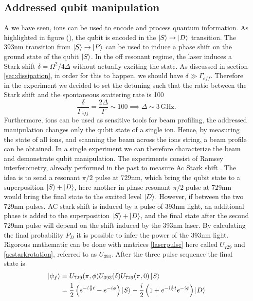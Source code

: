 \subsection{Addressed qubit manipulation}
A we have seen, ions can be used to encode and process quantum information. As highlighted in figure (), the qubit is encoded in the $\ket{S} \to \ket{D}$ transition. The 393nm transition from $\ket{S}\to \ket{P}$ can be used to induce a phase shift on the ground state of the qubit $\ket{S}$. In the off resonant regime, the laser induces a Stark shift $\delta = \Omega^2/4\Delta$ without actually exciting the state. As discussed in section \ref{sec:dissipation}, in order for this to happen, we should have $\delta \gg \Gamma_{eff}$. Therefore in the experiment we decided to set the detuning such that the ratio between the Stark shift and the spontaneous scattering rate is 100
\begin{equation}
\frac{\delta}{\Gamma_{eff}} = \frac{2\Delta}{\Gamma} \sim 100 \implies \Delta \sim 3\,\text{GHz}.
\end{equation}
Furthermore, ions can be used as sensitive tools for beam profiling, the addressed manipulation changes only the qubit state of a single ion. Hence, by measuring the state of all ions, and scanning the beam across the ions string, a beam profile can be obtained. In a single experiment we can therefore characterize the beam and demonstrate qubit manipulation.
The experiments consist of Ramsey interferometry, already performed in the past to measure Ac Stark shift \cite{starkshift}.
The idea is to send a resonant $\pi/2$ pulse at 729nm, which bring the qubit state to a superposition $\ket{S}+\ket{D}$, here another in phase resonant $\pi/2$ pulse at 729nm would bring the final state to the excited level $\ket{D}$. However, if between the two 729nm pulses, AC stark shift is induced by a pulse of 393nm light, an additional phase is added to the superposition $\ket{S}+\ket{D}$, and the final state after the second 729nm pulse will depend on the shift induced by the 393nm laser. By calculating the final probability $P_D$ it is possible to infer the power of the 393nm light. Rigorous mathematic can be done with matrices \eqref{laserpulse} here called $U_{729}$ and \eqref{acstarkrotation}, referred to as $U_{393}$. After the three pulse sequence the final state is
\begin{equation}
\begin{split}
\ket{\psi_f} &= U_{729}(\pi,\phi)U_{393}(\delta)U_{729}(\pi,0)\ket{S} \\
&= \frac{1}{2}\left(e^{-i\frac{\delta}{2}t}-e^{-i\phi}\right)\ket{S}-\frac{i}{2}\left(1 + e^{-i\frac{\delta}{2}t} e^{-i\phi}\right)\ket{D}
\end{split}
\end{equation}
